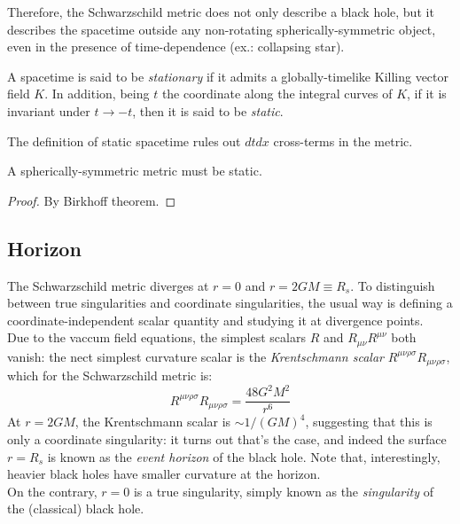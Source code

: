 Therefore, the Schwarzschild metric does not only describe a black hole, but it describes the spacetime outside any non-rotating spherically-symmetric object, even in the presence of time-dependence (ex.: collapsing star).

\begin{definition}
  A spacetime is said to be \textit{stationary} if it admits a globally-timelike Killing vector field $ K $. In addition, being $ t $ the coordinate along the integral curves of $ K $, if it is invariant under $ t \rightarrow -t $, then it is said to be \textit{static}.
\end{definition}

The definition of static spacetime rules out $ dt dx $ cross-terms in the metric.

\begin{proposition}
  A spherically-symmetric metric must be static.
\end{proposition}
\begin{proof}
  By Birkhoff theorem.
\end{proof}

\subsection{Horizon}

The Schwarzschild metric diverges at $ r = 0 $ and $ r = 2GM \equiv R_s $. To distinguish between true singularities and coordinate singularities, the usual way is defining a coordinate-independent scalar quantity and studying it at divergence points.\\
Due to the vaccum field equations, the simplest scalars $ R $ and $ R_{\mu \nu} R^{\mu \nu} $ both vanish: the nect simplest curvature scalar is the \textit{Krentschmann scalar} $ R^{\mu \nu \rho \sigma} R_{\mu \nu \rho \sigma} $, which for the Schwarzschild metric is:
\begin{equation}
  R^{\mu \nu \rho \sigma} R_{\mu \nu \rho \sigma} = \frac{48 G^2 M^2}{r^6}
  \label{eq:6.2}
\end{equation}
At $ r = 2GM $, the Krentschmann scalar is $ \sim 1 / (GM)^4 $, suggesting that this is only a coordinate singularity: it turns out that's the case, and indeed the surface $ r = R_s $ is known as the \textit{event horizon} of the black hole. Note that, interestingly, heavier black holes have smaller curvature at the horizon.\\
On the contrary, $ r = 0 $ is a true singularity, simply known as the \textit{singularity} of the (classical) black hole.

